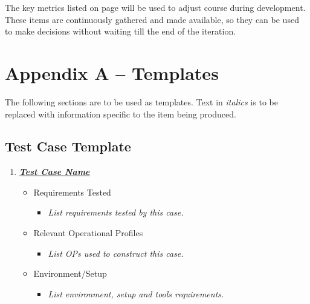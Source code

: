 \documentclass[11pt]{wacomepd}
\begin{document}
The key metrics listed on page \pageref{metrics} will be used to adjust course during development.
These items are continuously gathered and made available, so they can be used to make decisions
without waiting till the end of the iteration.


\addappheadtotoc

\clearpage
\appendix
\chapter{Appendix A -- Templates}
The following sections are to be used as templates.  Text in \textit{italics} is to be replaced with
information specific to the item being produced.

\section{Test Case Template}
\begin{enumerate}
\item \textbf{\underline{\textit{Test Case Name}}}
  \begin{itemize}
  \item Requirements Tested
    \begin{itemize} \item\textit{List requirements tested by this case.} \end{itemize}
  \item Relevant Operational Profiles
    \begin{itemize} \item\textit{List OPs used to construct this case.} \end{itemize}
  \item Environment/Setup
    \begin{itemize} \item\textit{List environment, setup and tools requirements.} \end{itemize}
  \end{itemize}
\end{enumerate}

\end{document}
